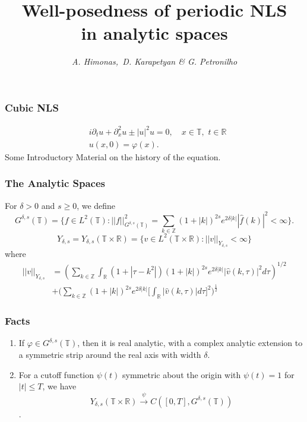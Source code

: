 \documentclass{beamer}
\date{}
\title
{ Well-posedness of  periodic NLS  \\in  analytic  spaces}
\author{{\it A.  Himonas,\, D. Karapetyan   \& G. Petronilho}}
\numberwithin{equation}{section}
\newcommand{\p}{\partial}
\newcommand{\ci}{\mathbb{T}}
\newcommand{\vp}{\varphi}
\begin{document}
\begin{frame}
\titlepage
\end{frame}


%
%
\begin{frame}
  \frametitle{Cubic NLS}
%
%
\begin{align*}
	&i \p_t u + \p_x^{2} u \pm
  |u|^2 u =0, \quad x\in \mathbb{T},\,\,t\in \mathbb{R}
		\\
		&u(x,0) = \vp(x).
\end{align*}
%
Some Introductory Material on the history of the equation.
\end{frame}
%
%
\begin{frame}
  \frametitle{The Analytic Spaces}
For $\delta >0$ and $s\ge 0$, we define 
$$G^{\delta, s}(\mathbb{T})=\{f\in L^2(\mathbb{T}): ||f||^2_{G^{\delta,s}(\mathbb{T})}=\sum_{k\in \mathbb{Z}} 
(1+ |k|)^{2s}e^{2\delta|k|}|\widehat{f}(k)|^2<\infty\}.$$
%
%
%
%
\[Y_{\delta,s}=Y_{\delta,s}(\mathbb{T}\times \mathbb{R})=\{v\in L^2(\mathbb{T}\times \mathbb{R}):
||v||_{Y_{\delta,s}}<\infty\}\]
where 
\begin{equation*}
  \begin{split}
    ||v||_{Y_{\delta,s}}
    & =\left( \sum_{k\in \mathbb{Z}}\int_{\mathbb{R}}(1+|\tau
-k^2|)(1+|k|)^{2s}
e^{2\delta |k|}|\widehat{v}(k,\tau)|^2d\tau\right)^{1/2}
\\
& +\Big (\sum_{k\in \mathbb{Z}}(1+|k|)^{2s}e^{2\delta |k|}
\Big [\int_{\mathbb{R}}
|\widehat{v}(k,\tau)|d\tau\Big ]^2 \Big )^{\frac{1}{2}} 
\end{split}
\end{equation*}
%
\end{frame}
%
%
\begin{frame}
  \frametitle{Facts}
  \begin{enumerate}
    \item If $\vp \in G^{\delta, s}(\ci)$, then it is real analytic, with a complex
  analytic extension to a symmetric strip around the real axis with width $\delta$.
\item
  For a cutoff function $\psi(t)$ symmetric about the origin with
  $\psi(t)=1$ for $| t | \le T$, we have
$$Y_{\delta,s}(\mathbb{T}\times \mathbb{R})
\xrightarrow{\psi} C([0,T],G^{\delta,s}(\mathbb{T}))$$.
  \end{enumerate}
\end{frame}
\end{document}
